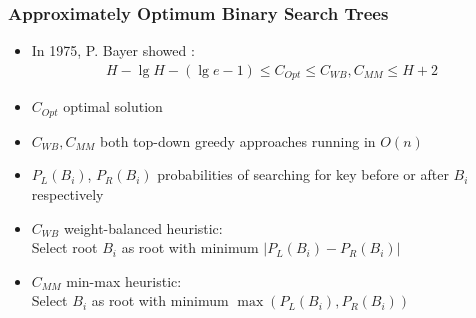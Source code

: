 \documentclass{beamer}
\theoremstyle{plain}
\begin{document}
\begin{frame} \frametitle{Approximately Optimum Binary Search Trees}


\begin{itemize}
\item In 1975, P. Bayer showed \cite{bayer1975improved}:
\begin{align*}
H-\lg H-(\lg e-1) \leq C_{Opt} \leq C_{WB}, C_{MM} \leq H + 2
\end{align*}

\item $C_{Opt}$ optimal solution

\item $C_{WB}, C_{MM}$ both top-down greedy approaches running in $O(n)$

\item $P_L(B_i)$,  $P_R(B_i)$ probabilities of searching for key before or after $B_i$ respectively

\item $C_{WB}$ weight-balanced heuristic: \\
Select root $B_i$ as root with minimum $|P_L(B_i)-P_R(B_i)|$

\item $C_{MM}$ min-max heuristic:  \\
Select $B_i$ as root with minimum $\max(P_L(B_i), P_R(B_i))$


\end{itemize}

\end{frame}
\end{document}
